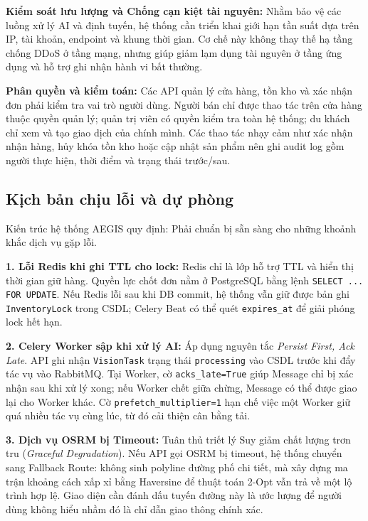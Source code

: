 \documentclass[12pt, a4paper]{article}
\begin{document}
\textbf{Kiểm soát lưu lượng và Chống cạn kiệt tài nguyên:} Nhằm bảo vệ các luồng xử lý AI và định tuyến, hệ thống cần triển khai giới hạn tần suất dựa trên IP, tài khoản, endpoint và khung thời gian. Cơ chế này không thay thế hạ tầng chống DDoS ở tầng mạng, nhưng giúp giảm lạm dụng tài nguyên ở tầng ứng dụng và hỗ trợ ghi nhận hành vi bất thường.

\textbf{Phân quyền và kiểm toán:} Các API quản lý cửa hàng, tồn kho và xác nhận đơn phải kiểm tra vai trò người dùng. Người bán chỉ được thao tác trên cửa hàng thuộc quyền quản lý; quản trị viên có quyền kiểm tra toàn hệ thống; du khách chỉ xem và tạo giao dịch của chính mình. Các thao tác nhạy cảm như xác nhận nhận hàng, hủy khóa tồn kho hoặc cập nhật sản phẩm nên ghi audit log gồm người thực hiện, thời điểm và trạng thái trước/sau.

\subsection{Kịch bản chịu lỗi và dự phòng}
Kiến trúc hệ thống AEGIS quy định: Phải chuẩn bị sẵn sàng cho những khoảnh khắc dịch vụ gặp lỗi.

\textbf{1. Lỗi Redis khi ghi TTL cho lock:} Redis chỉ là lớp hỗ trợ TTL và hiển thị thời gian giữ hàng. Quyền lực chốt đơn nằm ở PostgreSQL bằng lệnh \texttt{SELECT ... FOR UPDATE}. Nếu Redis lỗi sau khi DB commit, hệ thống vẫn giữ được bản ghi \texttt{InventoryLock} trong CSDL; Celery Beat có thể quét \texttt{expires\_at} để giải phóng lock hết hạn.

\textbf{2. Celery Worker sập khi xử lý AI:} Áp dụng nguyên tắc \textit{Persist First, Ack Late}. API ghi nhận \texttt{VisionTask} trạng thái \texttt{processing} vào CSDL trước khi đẩy tác vụ vào RabbitMQ. Tại Worker, cờ \texttt{acks\_late=True} giúp Message chỉ bị xác nhận sau khi xử lý xong; nếu Worker chết giữa chừng, Message có thể được giao lại cho Worker khác. Cờ \texttt{prefetch\_multiplier=1} hạn chế việc một Worker giữ quá nhiều tác vụ cùng lúc, từ đó cải thiện cân bằng tải.

\textbf{3. Dịch vụ OSRM bị Timeout:} Tuân thủ triết lý Suy giảm chất lượng trơn tru (\textit{Graceful Degradation}). Nếu API gọi OSRM bị timeout, hệ thống chuyển sang Fallback Route: không sinh polyline đường phố chi tiết, mà xây dựng ma trận khoảng cách xấp xỉ bằng Haversine để thuật toán 2-Opt vẫn trả về một lộ trình hợp lệ. Giao diện cần đánh dấu tuyến đường này là ước lượng để người dùng không hiểu nhầm đó là chỉ dẫn giao thông chính xác.
\end{document}
